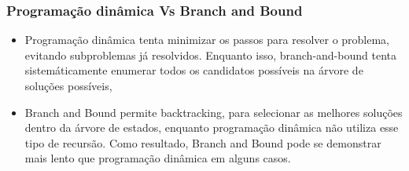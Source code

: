     \subsubsection{Programação dinâmica Vs Branch and Bound}

    \begin{itemize}
        \item Programação dinâmica tenta minimizar os passos para resolver 
        o problema, evitando subproblemas já resolvidos. Enquanto isso, 
        branch-and-bound tenta sistemáticamente enumerar todos os candidatos 
        possíveis na árvore de soluções possíveis,
        \item Branch and Bound permite backtracking, para selecionar as melhores 
        soluções dentro da árvore de estados, enquanto programação dinâmica não utiliza
        esse tipo de recursão. Como resultado, Branch and Bound pode se demonstrar 
        mais lento que programação dinâmica em alguns casos.
    \end{itemize}

    \nocite{dynamic-programming}

\newpage